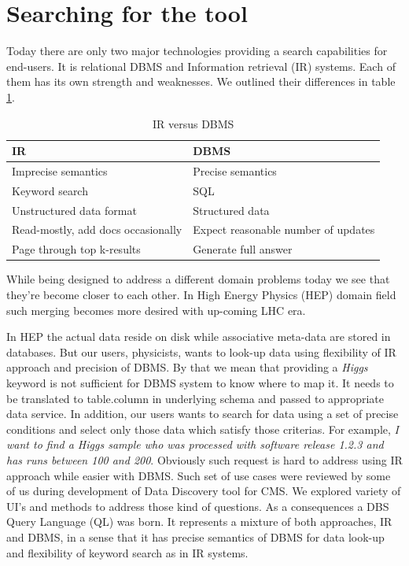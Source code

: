\documentclass[a4paper]{jpconf}
\begin{document}
\section{Searching for the tool}
Today there are only two major technologies providing a search capabilities
for end-users. It is relational DBMS and Information retrieval (IR) systems.
Each of them has its own strength and weaknesses. 
We outlined their differences in table \ref{IR_DBMS}.

\begin{table}[hbt]
\centering
\begin{tabular}{ll}\hline
\hline

IR & DBMS \\
\hline
Imprecise semantics & Precise semantics \\
Keyword search & SQL \\
Unstructured data format & Structured data \\
Read-mostly, add docs occasionally & Expect reasonable number of updates \\
Page through top k-results & Generate full answer \\
\hline
\hline
\end{tabular}
\caption{IR versus DBMS}
\label{IR_DBMS}
\end{table}

While being designed to address a different domain problems today 
we see that they're become closer to each other. In High Energy Physics (HEP)
domain field such merging becomes more desired with up-coming LHC era.

In HEP the actual data
reside on disk while associative meta-data are stored in databases.
But our users, physicists, wants to look-up data using flexibility of
IR approach and precision of DBMS. By that we mean that providing a {\it Higgs}
keyword is not sufficient for DBMS system to know where to map it. It needs
to be translated to table.column in underlying schema and passed to appropriate
data service.
In addition, our users wants
to search for data using a set of precise conditions and select only those
data which satisfy those criterias. For example, 
{\it I want to find a Higgs sample who was processed with software release
1.2.3 and has runs between 100 and 200}. Obviously such request is
hard to address using IR approach while easier with DBMS. 
Such set of use cases were reviewed by some of us
\cite{DBS07} during development of Data Discovery tool for CMS. We explored
variety of UI's and methods to address those kind of questions. As a
consequences a DBS Query Language (QL) was born. It represents a mixture
of both approaches, IR and DBMS, in a sense that it has precise
semantics of DBMS for data look-up and flexibility of
keyword search as in IR systems.
\end{document}
